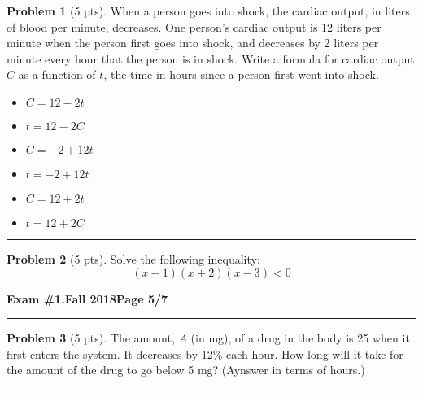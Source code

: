 \documentclass[12pt]{article}
\makeatletter
\theoremstyle{definition}
\newtheorem{problem}{Problem}
\newcommand*{\radiobutton}{%
  \@ifstar{\@radiobutton0}{\@radiobutton1}%
}
\newcommand*{\@radiobutton}[1]{%
  \begin{tikzpicture}
    \pgfmathsetlengthmacro\radius{height("X")/2}
    \draw[radius=\radius] circle;
    \ifcase#1 \fill[radius=.6*\radius] circle;\fi
  \end{tikzpicture}%
}
\makeatother
\begin{document}
\begin{problem}[5 pts]
  When a person goes into shock, the cardiac output, in liters of blood per minute, decreases. One person’s cardiac output
  is 12 liters per minute when the person first goes into shock, and decreases by 2 liters per minute every hour that the
  person is in shock. Write a formula for cardiac output $C$ as a function of $t$, the time in hours since a person first
  went into shock. 
  \begin{itemize}
  \item[\radiobutton] $C = 12 - 2t$
  \item[\radiobutton] $t = 12 - 2C$
  \item[\radiobutton] $C = -2 + 12t$
  \item[\radiobutton] $t = -2 + 12t$
  \item[\radiobutton] $C = 12 + 2t$
  \item[\radiobutton] $t = 12 + 2C$
  \end{itemize}
\end{problem}
\hrule

\begin{problem}[5 pts]
  Solve the following inequality:
  \begin{equation*} (x-1)(x+2)(x-3) < 0 \end{equation*}
\end{problem}

\newpage

\hfill{\large\bf Exam \#1.}\hfill{\large\bf  Fall 2018}\hfill{\large\bf Page 5/7}\hrule

\bigskip

\begin{problem}[5 pts]
  The amount, $A$ (in mg), of a drug in the body is 25 when it first enters the system.  It decreases by 12\% each hour.
  How long will it take for the amount of the drug to go below 5 mg? (Aynswer in terms of hours.)

  \vspace{8cm}
\end{problem}
\hrule
\end{document}
